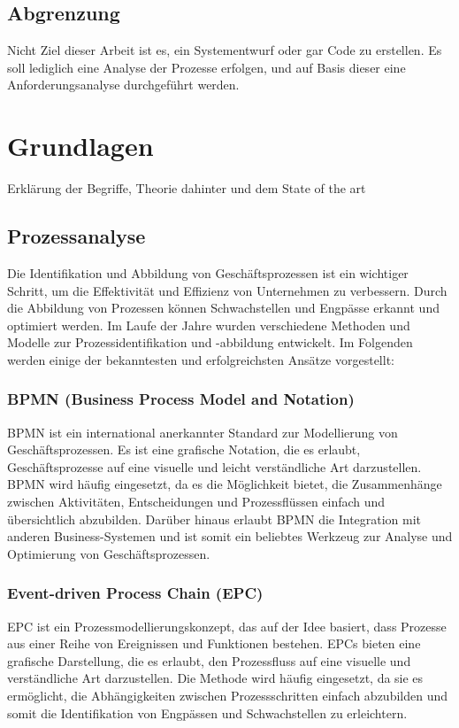 \documentclass[11pt,a4paper]{scrartcl}
\begin{document}
\subsection{Abgrenzung}\label{subsec:abgrenzung}
Nicht Ziel dieser Arbeit ist es, ein Systementwurf oder gar Code zu erstellen.
Es soll lediglich eine Analyse der Prozesse erfolgen, und auf Basis dieser eine Anforderungsanalyse durchgeführt werden.

\section{Grundlagen}\label{sec:grundlagen}
Erklärung der Begriffe, Theorie dahinter und dem State of the art
\subsection{Prozessanalyse}\label{subsec:prozessanalyse-grundlagen}
Die Identifikation und Abbildung von Geschäftsprozessen ist ein wichtiger Schritt, um die Effektivität und Effizienz von Unternehmen zu verbessern. Durch die Abbildung von Prozessen können Schwachstellen und Engpässe erkannt und optimiert werden. Im Laufe der Jahre wurden verschiedene Methoden und Modelle zur Prozessidentifikation und -abbildung entwickelt. Im Folgenden werden einige der bekanntesten und erfolgreichsten Ansätze vorgestellt:

\subsubsection{BPMN (Business Process Model and Notation)}

BPMN ist ein international anerkannter Standard zur Modellierung von Geschäftsprozessen.
Es ist eine grafische Notation, die es erlaubt, Geschäftsprozesse auf eine visuelle und leicht verständliche Art darzustellen.
BPMN wird häufig eingesetzt, da es die Möglichkeit bietet, die Zusammenhänge zwischen Aktivitäten, Entscheidungen und Prozessflüssen einfach und übersichtlich abzubilden.
Darüber hinaus erlaubt BPMN die Integration mit anderen Business-Systemen und ist somit ein beliebtes Werkzeug zur Analyse und Optimierung von Geschäftsprozessen.

\subsubsection{Event-driven Process Chain (EPC)}

EPC ist ein Prozessmodellierungskonzept, das auf der Idee basiert, dass Prozesse aus einer Reihe von Ereignissen und Funktionen bestehen.
EPCs bieten eine grafische Darstellung, die es erlaubt, den Prozessfluss auf eine visuelle und verständliche Art darzustellen.
Die Methode wird häufig eingesetzt, da sie es ermöglicht, die Abhängigkeiten zwischen Prozessschritten einfach abzubilden und somit die Identifikation von Engpässen und Schwachstellen zu erleichtern.
\end{document}
